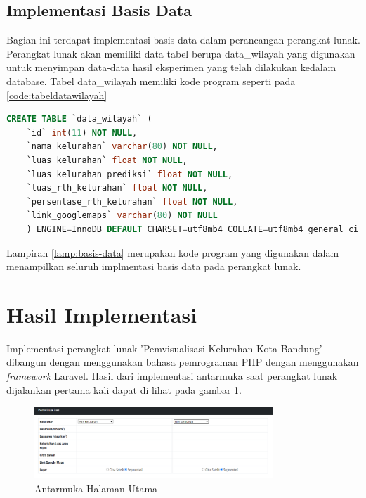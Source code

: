 \subsection{Implementasi Basis Data}
\label{subsec:implmentasiBasisData}
Bagian ini terdapat implementasi basis data dalam perancangan perangkat lunak. Perangkat lunak akan memiliki data tabel berupa data\_wilayah yang digunakan untuk menyimpan data-data hasil eksperimen yang telah dilakukan kedalam database. Tabel data\_wilayah memiliki kode program seperti pada \ref{code:tabeldatawilayah}

\begin{lstlisting}[language=SQL, caption=Implementasi Tabel data\_wilayah,label={code:tabeldatawilayah}]
	CREATE TABLE `data_wilayah` (
	`id` int(11) NOT NULL,
	`nama_kelurahan` varchar(80) NOT NULL,
	`luas_kelurahan` float NOT NULL,
	`luas_kelurahan_prediksi` float NOT NULL,
	`luas_rth_kelurahan` float NOT NULL,
	`persentase_rth_kelurahan` float NOT NULL,
	`link_googlemaps` varchar(80) NOT NULL
	) ENGINE=InnoDB DEFAULT CHARSET=utf8mb4 COLLATE=utf8mb4_general_ci;
\end{lstlisting}

Lampiran \ref{lamp:basis-data} merupakan kode program yang digunakan dalam menampilkan seluruh implmentasi basis data pada perangkat lunak.

\section{Hasil Implementasi}
\label{sec:hasil-implementasi}
Implementasi perangkat lunak 'Pemvisualisasi Kelurahan Kota Bandung' dibangun dengan menggunakan bahasa pemrograman PHP dengan menggunakan \textit{framework} Laravel. Hasil  dari implementasi antarmuka saat perangkat lunak dijalankan pertama kali dapat di lihat pada gambar \ref{fig:home1}.
\begin{figure}[H]
	\centering
	\includegraphics[width=0.8\textwidth]{Gambar/home1.png}
	\caption{Antarmuka Halaman Utama}
	\label{fig:home1}
\end{figure}

